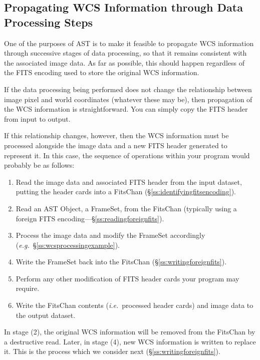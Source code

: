 \documentclass[twoside,11pt]{starlink}
\providecommand{\secref}[1]{\S\ref{#1}}
\begin{document}
\subsection{\label{ss:propagatingwcsinformation}Propagating WCS Information through Data Processing Steps}

One of the purposes of AST is to make it feasible to propagate WCS
information through successive stages of data processing, so that it
remains consistent with the associated image data. As far as possible,
this should happen regardless of the FITS encoding used to store the
original WCS information.

If the data processing being performed does not change the
relationship between image pixel and world coordinates (whatever these
may be), then propagation of the WCS information is
straightforward. You can simply copy the FITS header from input to
output.

If this relationship changes, however, then the WCS information must
be processed alongside the image data and a new FITS header generated
to represent it. In this case, the sequence of operations within your
program would probably be as follows:

\begin{enumerate}
\item Read the image data and associated FITS header from the input
dataset, putting the header cards into a FitsChan
(\secref{ss:identifyingfitsencoding}).

\item Read an AST Object, a FrameSet, from the FitsChan (typically
using a foreign FITS encoding---\secref{ss:readingforeignfits}).

\item Process the image data and modify the FrameSet accordingly
(\emph{e.g.}~\secref{ss:wcsprocessingexample}).

\item Write the FrameSet back into the FitsChan
(\secref{ss:writingforeignfits}).

\item Perform any other modification of FITS header cards your program
may require.

\item Write the FitsChan contents (\emph{i.e.}\ processed header
cards) and image data to the output dataset.
\end{enumerate}

In stage (2), the original WCS information will be removed from the
FitsChan by a destructive read. Later, in stage (4), new WCS
information is written to replace it. This is the process which we
consider next (\secref{ss:writingforeignfits}).
\end{document}
